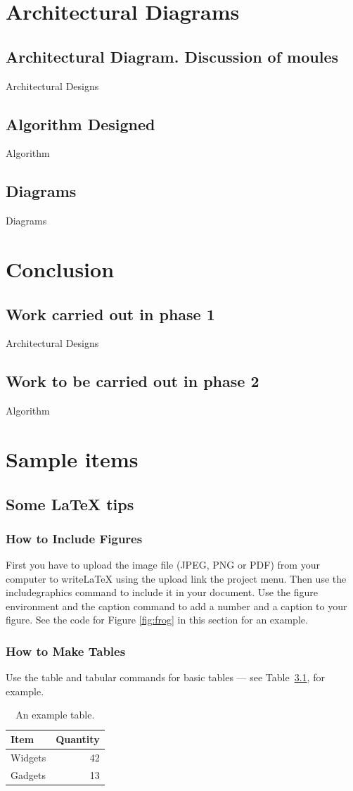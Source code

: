 \documentclass[a4paper]{report}
\begin{document}
    \chapter {Architectural Diagrams}
    \section{Architectural Diagram. Discussion of moules}
    Architectural Designs
    \section{Algorithm Designed}
    Algorithm 
    \section{Diagrams}
    Diagrams

    \chapter {Conclusion}
    \section{Work carried out in phase 1}
    Architectural Designs
    \section{Work to be carried out in phase 2}
    Algorithm     


    \chapter{Sample items}
    \section{Some LaTeX tips}
    \label{sec:latex}
    \subsection{How to Include Figures}    
    First you have to upload the image file (JPEG, PNG or PDF) from your computer to writeLaTeX using the upload link the project menu. Then use the includegraphics command to include it in your document. Use the figure environment and the caption command to add a number and a caption to your figure. See the code for Figure \ref{fig:frog} in this section for an example.            
    \subsection{How to Make Tables}    
    Use the table and tabular commands for basic tables --- see Table~\ref{tab:widgets}, for example.    
    \begin{table}
    \centering
    \begin{tabular}{l|r}
    Item & Quantity \\\hline
    Widgets & 42 \\
    Gadgets & 13
    \end{tabular}
    \caption{\label{tab:widgets}An example table.}
    \end{table}    
\end{document}
